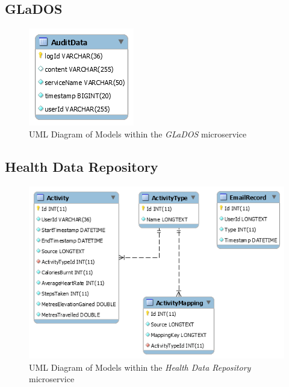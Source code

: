 \subsection{GLaDOS}
\begin{figure}[H]
    \centering
    \includegraphics[width=\textwidth]{Images/db_uml/glados.png}
    \caption{UML Diagram of Models within the \textit{GLaDOS} microservice}
    \label{fig:db_uml:glados}
\end{figure}

\subsection{Health Data Repository}
\begin{figure}[H]
    \centering
    \includegraphics[width=\textwidth]{Images/db_uml/health-data-repository.png}
    \caption{UML Diagram of Models within the \textit{Health Data Repository} microservice}
    \label{fig:db_uml:health-data-repository}
\end{figure}

